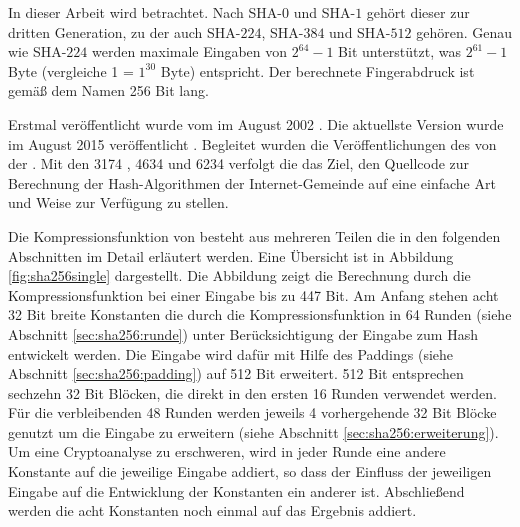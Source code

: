 In dieser Arbeit wird  betrachtet. Nach SHA-$0$ und SHA-$1$ gehört dieser zur dritten Generation, zu der auch SHA-$224$, SHA-$384$ und SHA-$512$ gehören.
Genau wie SHA-$224$ werden maximale Eingaben von $ 2^{64} - 1$ Bit unterstützt, was $ 2^{61} - 1 $ Byte (vergleiche 1  = $ 1^{30} $ Byte) entspricht.
Der berechnete Fingerabdruck ist gemäß dem Namen 256 Bit lang.

Erstmal veröffentlicht wurde  vom  im August 2002 \cite{nist1802}. Die aktuellste Version wurde im August 2015 veröffentlicht \cite{nist1804}.
Begleitet wurden die Veröffentlichungen des  von der . Mit den  3174 \cite{rfc3174}, 4634 \cite{rfc4634} und 6234 \cite{rfc6234}
verfolgt die  das Ziel, den Quellcode zur Berechnung der Hash-Algorithmen der Internet-Gemeinde auf eine einfache Art und Weise zur Verfügung zu stellen.

Die Kompressionsfunktion von  besteht aus mehreren Teilen die in den folgenden Abschnitten im Detail erläutert werden. Eine Übersicht ist in Abbildung
\ref{fig:sha256single} dargestellt. Die Abbildung zeigt die Berechnung durch die Kompressionsfunktion bei einer Eingabe bis zu 447 Bit. Am Anfang stehen acht
32 Bit breite Konstanten die durch die Kompressionsfunktion in 64 Runden (siehe Abschnitt \ref{sec:sha256:runde}) unter Berücksichtigung der Eingabe zum Hash
entwickelt werden. Die Eingabe wird dafür mit Hilfe des Paddings (siehe Abschnitt \ref{sec:sha256:padding}) auf 512 Bit erweitert. 512 Bit entsprechen sechzehn
32 Bit Blöcken, die direkt in den ersten 16 Runden verwendet werden. Für die verbleibenden 48 Runden werden jeweils 4 vorhergehende 32 Bit Blöcke genutzt um die
Eingabe zu erweitern (siehe Abschnitt \ref{sec:sha256:erweiterung}). Um eine Cryptoanalyse zu erschweren, wird in jeder Runde eine andere Konstante auf die
jeweilige Eingabe addiert, so dass der Einfluss der jeweiligen Eingabe auf die Entwicklung der Konstanten ein anderer ist. Abschließend werden die acht Konstanten
noch einmal auf das Ergebnis addiert.

